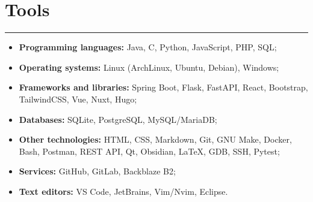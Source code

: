 \section*{Tools}
\par\noindent\rule{\textwidth}{0.1mm}

\begin{itemize}
    \item \textbf{Programming languages:} Java, C, Python, JavaScript, PHP, SQL;
    \item \textbf{Operating systems:} Linux (ArchLinux, Ubuntu, Debian), Windows;
    \item \textbf{Frameworks and libraries:} Spring Boot, Flask, FastAPI, React, Bootstrap, TailwindCSS, Vue, Nuxt, Hugo;
    \item \textbf{Databases:} SQLite, PostgreSQL, MySQL/MariaDB;
    \item \textbf{Other technologies:} HTML, CSS, Markdown, Git, GNU Make, Docker, Bash, Postman,
        REST API, Qt, Obsidian, \LaTeX, GDB, SSH, Pytest;
    \item \textbf{Services:} GitHub, GitLab, Backblaze B2; 
    \item \textbf{Text editors:} VS Code, JetBrains, Vim/Nvim, Eclipse.
\end{itemize}
